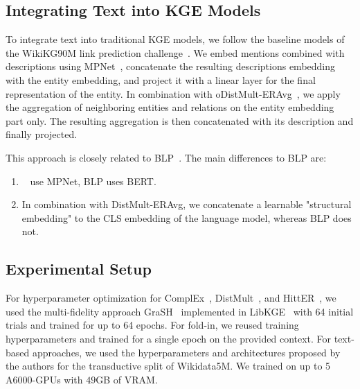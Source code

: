 \documentclass[11pt]{article}
\renewcommand\:{\colon} \newcommand{\sset}[1]{\left\{\,#1\,\right\}} \newcommand{\ssets}[1]{\left\{#1\right\}} \newcommand{\ssetn}[1]{\{\,#1\,\}}
\begin{document}
\subsection{Integrating Text into KGE Models}
\label{sec:text_kge}


To integrate text into traditional KGE models, we follow the baseline models of the WikiKG90M link prediction challenge~\cite{hu2021ogblsc}.
We embed mentions combined with descriptions using MPNet~\cite{song2020mpnet}, concatenate the resulting descriptions embedding with the entity embedding, and project it with a linear layer for the final representation of the entity.
In combination with oDistMult-ERAvg~\cite{albooyeh2020out}, we apply the aggregation of neighboring entities and relations on the entity embedding part only.
The resulting aggregation is then concatenated with its description and finally projected.

\balance
This approach is closely related to BLP~\cite{daza2021inductive}.
The main differences to BLP are:
\begin{enumerate}
\item~\citet{hu2021ogblsc} use MPNet, BLP uses BERT.
  \item In combination with DistMult-ERAvg, we concatenate a learnable "structural embedding" to the CLS embedding of the language model, whereas BLP does not.
\end{enumerate}



\subsection{Experimental Setup}
\label{sec:experimental_setup}

For hyperparameter optimization for ComplEx~\cite{trouillon2016complex}, DistMult~\cite{yang2015embedding}, and HittER~\cite{chen2021hitter}, we used the multi-fidelity approach GraSH~\cite{kochsiek2023start} implemented in LibKGE~\cite{libkge} with 64 initial trials and trained for up to 64 epochs.
For fold-in, we reused training hyperparameters and trained for a single epoch on the provided context.
For text-based approaches, we used the hyperparameters and architectures proposed by the authors for the transductive split of Wikidata5M.
We trained on up to 5 A6000-GPUs with $49$GB of VRAM.
\end{document}

